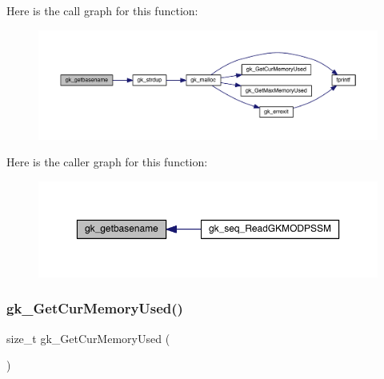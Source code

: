 Here is the call graph for this function\+:\nopagebreak
\begin{figure}[H]
\begin{center}
\leavevmode
\includegraphics[width=350pt]{a00077_ad732cbb6372e1eb9b396792f700091a5_cgraph}
\end{center}
\end{figure}
Here is the caller graph for this function\+:\nopagebreak
\begin{figure}[H]
\begin{center}
\leavevmode
\includegraphics[width=350pt]{a00077_ad732cbb6372e1eb9b396792f700091a5_icgraph}
\end{center}
\end{figure}
\mbox{\label{a00077_ad2327b94227019b6753b6b09400c0522}} 
\subsubsection{\texorpdfstring{gk\+\_\+\+Get\+Cur\+Memory\+Used()}{gk\_GetCurMemoryUsed()}}
{\footnotesize\ttfamily size\+\_\+t gk\+\_\+\+Get\+Cur\+Memory\+Used (\begin{DoxyParamCaption}{ }\end{DoxyParamCaption})}

